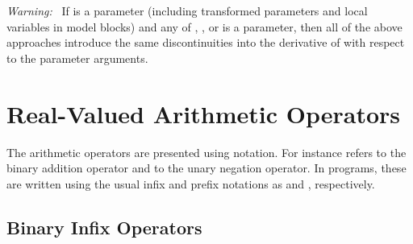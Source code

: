 \emph{Warning: } \ If  is a parameter (including transformed
parameters and local variables in model blocks) and any of ,
, or  is a parameter, then all of the above
approaches introduce the same discontinuities into the derivative of
 with respect to the parameter arguments.


\section{Real-Valued Arithmetic Operators}\label{real-valued-arithmetic-operators.section}

The arithmetic operators are presented using \Cpp notation.  For
instance  refers to the binary addition operator
and  to the unary negation operator.  In \Stan
programs, these are written using the usual infix and prefix notations
as  and , respectively.

\subsection{Binary Infix Operators}

\begin{description}
%
%
%
%
%
\end{description}

